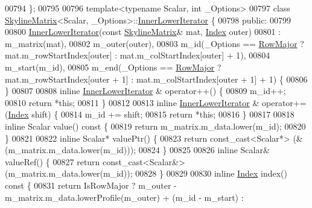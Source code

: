\begin{DoxyCode}
00794 \};
00795 
00796 \textcolor{keyword}{template}<\textcolor{keyword}{typename} Scalar, \textcolor{keywordtype}{int} \_Options>
00797 \textcolor{keyword}{class }\hyperlink{class_eigen_1_1_skyline_matrix}{SkylineMatrix}<Scalar, \_Options>::\hyperlink{class_eigen_1_1_skyline_matrix_1_1_inner_lower_iterator}{InnerLowerIterator} \{
00798 \textcolor{keyword}{public}:
00799 
00800     \hyperlink{class_eigen_1_1_skyline_matrix_1_1_inner_lower_iterator}{InnerLowerIterator}(\textcolor{keyword}{const} \hyperlink{class_eigen_1_1_skyline_matrix}{SkylineMatrix}& mat, 
      \hyperlink{group___core___module_a554f30542cc2316add4b1ea0a492ff02}{Index} outer)
00801     : m\_matrix(mat),
00802     m\_outer(outer),
00803     m\_id(\_Options == \hyperlink{group__enums_ggaacded1a18ae58b0f554751f6cdf9eb13acfcde9cd8677c5f7caf6bd603666aae3}{RowMajor} ? mat.m\_rowStartIndex[outer] : mat.m\_colStartIndex[outer] + 1),
00804     m\_start(m\_id),
00805     m\_end(\_Options == \hyperlink{group__enums_ggaacded1a18ae58b0f554751f6cdf9eb13acfcde9cd8677c5f7caf6bd603666aae3}{RowMajor} ? mat.m\_rowStartIndex[outer + 1] : mat.m\_colStartIndex[outer + 1] + 
      1) \{
00806     \}
00807 
00808     \textcolor{keyword}{inline} \hyperlink{class_eigen_1_1_skyline_matrix_1_1_inner_lower_iterator}{InnerLowerIterator} & operator++() \{
00809         m\_id++;
00810         \textcolor{keywordflow}{return} *\textcolor{keyword}{this};
00811     \}
00812 
00813     \textcolor{keyword}{inline} \hyperlink{class_eigen_1_1_skyline_matrix_1_1_inner_lower_iterator}{InnerLowerIterator} & operator+=(\hyperlink{group___core___module_a554f30542cc2316add4b1ea0a492ff02}{Index} shift) \{
00814         m\_id += shift;
00815         \textcolor{keywordflow}{return} *\textcolor{keyword}{this};
00816     \}
00817 
00818     \textcolor{keyword}{inline} Scalar value()\textcolor{keyword}{ const }\{
00819         \textcolor{keywordflow}{return} m\_matrix.m\_data.lower(m\_id);
00820     \}
00821 
00822     \textcolor{keyword}{inline} Scalar* valuePtr() \{
00823         \textcolor{keywordflow}{return} \textcolor{keyword}{const\_cast<}Scalar*\textcolor{keyword}{>} (&(m\_matrix.m\_data.lower(m\_id)));
00824     \}
00825 
00826     \textcolor{keyword}{inline} Scalar& valueRef() \{
00827         \textcolor{keywordflow}{return} \textcolor{keyword}{const\_cast<}Scalar&\textcolor{keyword}{>} (m\_matrix.m\_data.lower(m\_id));
00828     \}
00829 
00830     \textcolor{keyword}{inline} \hyperlink{group___core___module_a554f30542cc2316add4b1ea0a492ff02}{Index} index()\textcolor{keyword}{ const }\{
00831         \textcolor{keywordflow}{return} IsRowMajor ? m\_outer - m\_matrix.m\_data.lowerProfile(m\_outer) + (m\_id - m\_start) :

\end{DoxyCode}
